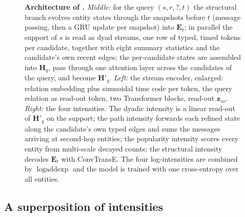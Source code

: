 \section{\model{}}
\label{sec:method}

\begin{figure}[!tb]
  \centering
  \caption{\textbf{Architecture of \model{}.} \emph{Middle:} for the query $(s, r, ?, t)$ the structural branch evolves entity states through the snapshots before $t$ (message passing, then a GRU update per snapshot) into $\mathbf{E}_t$; in parallel the support of $s$ is read as dyad streams, one row of typed, timed tokens per candidate, together with eight summary statistics and the candidate's own recent edges; the per-candidate states are assembled into $\mathbf{H}_q$, pass through one attention layer across the candidates of the query, and become $\mathbf{H}'_q$. \emph{Left:} the stream encoder, enlarged: relation embedding plus sinusoidal time code per token, the query relation as read-out token, two Transformer blocks, read-out $\mathbf{z}_{so}$. \emph{Right:} the four intensities. The dyadic intensity is a linear read-out of $\mathbf{H}'_q$ on the support; the path intensity forwards each refined state along the candidate's own typed edges and sums the messages arriving at second-hop entities; the popularity intensity scores every entity from multi-scale decayed counts; the structural intensity decodes $\mathbf{E}_t$ with ConvTransE. The four log-intensities are combined by $\operatorname{logaddexp}$ and the model is trained with one cross-entropy over all entities.}
  \label{fig:overview}
\end{figure}

\subsection{A superposition of intensities}

